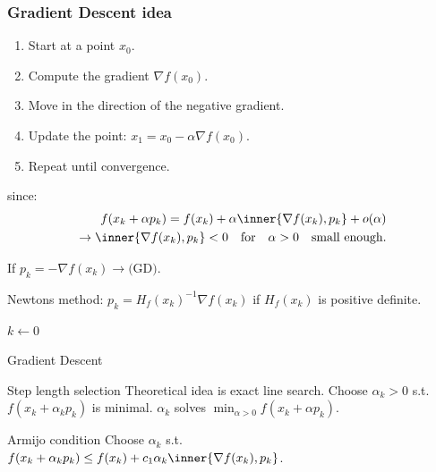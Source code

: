\subsubsection*{Gradient Descent idea}
\begin{enumerate}
	\item Start at a point \( x_0 \).
	\item Compute the gradient \( \nabla f(x_0) \).
	\item Move in the direction of the negative gradient.
	\item Update the point: \( x_1 = x_0 - \alpha \nabla f(x_0) \).
	\item Repeat until convergence.
\end{enumerate}

since:
\begin{align*}
	f(x_k + \alpha p_k) = f(x_k) + \alpha \inner{\nabla f(x_k), p_k} + o(\alpha) \\
	\rightarrow \inner{\nabla f(x_k), p_k} < 0 \quad \text{for} \quad \alpha > 0 \quad \text{small enough}.
\end{align*}

\begin{example}{}{}
	If  \(p_k = - \nabla f(x_k) \rightarrow \text{(GD)}\).

	Newtons method:  \(p_k = H_f(x_k)^{-1} \nabla f(x_k)\) if  \(H_f(x_k)\) is positive definite.
\end{example}

\begin{algorithm}[H]
	\SetAlgoLined
	\(k \gets 0\)\;
	\;
	\caption{Gradient Descent}
\end{algorithm}

\begin{remark}{Step length selection}{}
	Theoretical idea is exact line search. Choose  \(\alpha_k > 0\) s.t.  \(f(x_k + \alpha_k p_k)\) is minimal.
	\(\alpha_k\) solves  \(\min_{\alpha > 0} f(x_k + \alpha p_k)\).
\end{remark}

\begin{definition}{Armijo condition}{}
	Choose  \(\alpha_k\) s.t.  \(f(x_k + \alpha_k p_k) \leq f(x_k) + c_1 \alpha_k \inner{\nabla f(x_k), p_k}\).
\end{definition}

